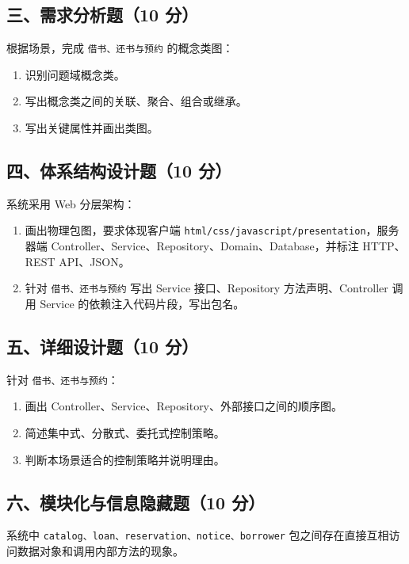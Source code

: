 \documentclass[UTF8,zihao=-4]{ctexart}
\begin{document}
\subsection{三、需求分析题（10 分）}


根据场景，完成 \texttt{借书、还书与预约} 的概念类图：


\begin{enumerate}
\item 识别问题域概念类。
\item 写出概念类之间的关联、聚合、组合或继承。
\item 写出关键属性并画出类图。
\end{enumerate}


\subsection{四、体系结构设计题（10 分）}


系统采用 Web 分层架构：


\begin{enumerate}
\item 画出物理包图，要求体现客户端 \texttt{html/css/javascript/presentation}，服务器端 Controller、Service、Repository、Domain、Database，并标注 HTTP、REST API、JSON。
\item 针对 \texttt{借书、还书与预约} 写出 Service 接口、Repository 方法声明、Controller 调用 Service 的依赖注入代码片段，写出包名。
\end{enumerate}


\subsection{五、详细设计题（10 分）}


针对 \texttt{借书、还书与预约}：


\begin{enumerate}
\item 画出 Controller、Service、Repository、外部接口之间的顺序图。
\item 简述集中式、分散式、委托式控制策略。
\item 判断本场景适合的控制策略并说明理由。
\end{enumerate}


\subsection{六、模块化与信息隐藏题（10 分）}


系统中 \texttt{catalog、loan、reservation、notice、borrower} 包之间存在直接互相访问数据对象和调用内部方法的现象。
\end{document}
